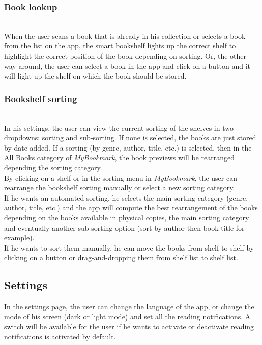 \documentclass[conference]{IEEEtran}
\begin{document}
\subsubsection{Book lookup}\hfill\\
When the user scans a book that is already in his collection or selects a book from the list on the app, the smart bookshelf lights up the correct shelf to highlight the correct position of the book depending on sorting. Or, the other way around, the user can select a book in the app and click on a button and it will light up the shelf on which the book should be stored.\\

\subsubsection{Bookshelf sorting}\hfill\\
In his settings, the user can view the current sorting of the shelves in two dropdowns: sorting and sub-sorting. If none is selected, the books are just stored by date added. If a sorting (by genre, author, title, etc.) is selected, then in the All Books category of \textit{MyBookmark}, the book previews will be rearranged depending the sorting category.\\
By clicking on a shelf or in the sorting menu in \textit{MyBookmark}, the user can rearrange the bookshelf sorting manually or select a new sorting category. \\
If he wants an automated sorting, he selects the main sorting category (genre, author, title, etc.) and the app will compute the best rearrangement of the books depending on the books available in physical copies, the main sorting category and eventually another sub-sorting option (sort by author then book title for example).\\
If he wants to sort them manually, he can move the books from shelf to shelf by clicking on a button or drag-and-dropping them from shelf list to shelf list.\\


\subsection{Settings}\hfill

In the settings page, the user can change the language of the app, or change the mode of his screen (dark or light mode) and set all the reading notifications. A switch will be available for the user if he wants to activate or deactivate reading notifications is activated by default.\\
\end{document}

